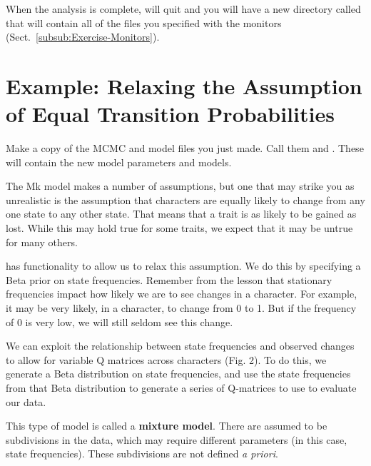 When the analysis is complete, \RevBayes will quit and you will have a new directory called  that will contain all of the files you specified with the monitors (Sect.\ \ref{subsub:Exercise-Monitors}).


\section{Example: Relaxing the Assumption of Equal Transition Probabilities }\label{sec:dm_disc}


{\begin{framed}
Make a copy of the MCMC and model files you just made. 
Call them  and . 
These will contain the new model parameters and models. \par 
\end{framed}}
\begin{figure}[h!]
\label{fig:module-gm}
\end{figure}
The Mk model makes a number of assumptions, but one that may strike you as unrealistic is the assumption that characters are equally likely to change from any one state to any other state.
That means that a trait is as likely to be gained as lost.
While this may hold true for some traits, we expect that it may be untrue for many others. \par
{} has functionality to allow us to relax this assumption.
We do this by specifying a Beta prior on state frequencies.
Remember from the  lesson that stationary frequencies impact how likely we are to see changes in a character.
For example, it may be very likely, in a character, to change from 0 to 1.
But if the frequency of 0 is very low, we will still seldom see this change. \par
We can exploit the relationship between state frequencies and observed changes to allow for variable Q matrices across characters (Fig. 2).
To do this, we generate a Beta distribution on state frequencies, and use the state frequencies from that Beta distribution to generate a series of Q-matrices to use to evaluate our data. \par
This type of model is called a \textbf{mixture model}.
There are assumed to be subdivisions in the data, which may require different parameters (in this case, state frequencies).
These subdivisions are not defined \textit{a priori}. \par




